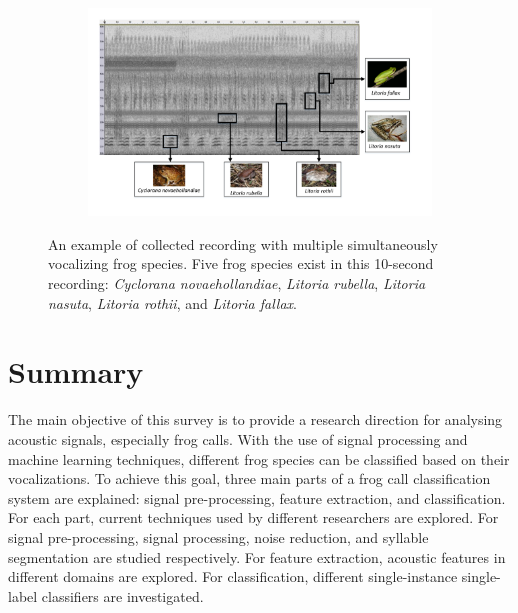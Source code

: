 \begin{figure}[htb!]
\centering
    \begin{subfigure}[b]{\textwidth}
           \includegraphics[width=1\textwidth]{image/LR/label.pdf}
    \end{subfigure}%
\caption[An example of collected recording]{An example of collected recording with multiple simultaneously vocalizing frog species. Five frog species exist in this 10-second recording: \textit{Cyclorana novaehollandiae}, \textit{Litoria rubella}, \textit{Litoria nasuta}, \textit{Litoria rothii}, and \textit{Litoria fallax}.}
\label{fig:label}       
\end{figure}



\section{Summary}
\label{conclusion}
The main objective of this survey is to provide a research direction for analysing acoustic signals, especially frog calls. With the use of signal processing and machine learning techniques, different frog species can be classified based on their vocalizations. To achieve this goal, three main parts of a frog call classification system are explained: signal pre-processing, feature extraction, and classification. For each part, current techniques used by different researchers are explored. For signal pre-processing, signal processing, noise reduction, and syllable segmentation are studied respectively. For feature extraction, acoustic features in different domains are explored. For classification, different single-instance single-label classifiers are investigated. 


